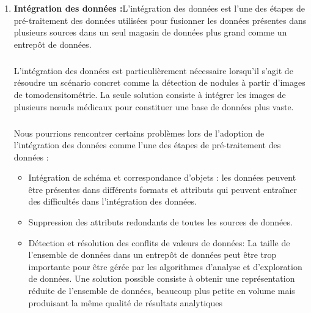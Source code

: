 \documentclass[a4paper, 12pt]{article}
\begin{document}
\begin{itemize}
\begin{enumerate}
			\item {\textbf{Intégration des données :}}L'intégration des données est l'une des étapes de pré-traitement des données utilisées pour fusionner les données présentes dans plusieurs sources dans un seul magasin de données plus grand comme un entrepôt de données.
			\subparagraph{}L'intégration des données est particulièrement nécessaire lorsqu'il s'agit de résoudre un scénario concret comme la détection de nodules à partir d'images de tomodensitométrie. La seule solution consiste à intégrer les images de plusieurs nœuds médicaux pour constituer une base de données plus vaste.
			\subparagraph{}Nous pourrions rencontrer certains problèmes lors de l’adoption de l’intégration des données comme l’une des étapes de pré-traitement des données :
			\begin{itemize}
				\item 	Intégration de schéma et correspondance d'objets : les données peuvent être présentes dans différents formats et attributs qui peuvent entraîner des difficultés dans l'intégration des données. 
				\item Suppression des attributs redondants de toutes les sources de données. 
				\item Détection et résolution des conflits de valeurs de données: La taille de l’ensemble de données dans un entrepôt de données peut être trop importante pour être gérée par les algorithmes d’analyse et d’exploration de données.
				Une solution possible consiste à obtenir une représentation réduite de l’ensemble de données, beaucoup plus petite en volume mais produisant la même qualité de résultats analytiques
			\end{itemize}
		\end{enumerate}
	\end{itemize}
	
\end{document}
